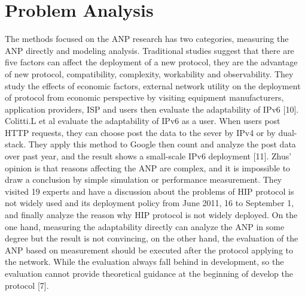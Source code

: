 \documentclass{article}
\begin{document}
\section{Problem Analysis}
The methods focused on the ANP research has two categories, measuring the ANP directly and modeling
analysis. Traditional studies suggest that there are five factors can affect the deployment of a new 
protocol, they are the advantage of new protocol, compatibility, complexity, workability and observability. 
They study the effects of economic factors, external network utility on the deployment of protocol 
from economic perspective by visiting equipment manufacturers, application providers, ISP and users 
then evaluate the adaptability of IPv6 [10]. Colitti.L et al evaluate the adaptability of IPv6 as a 
user. When users post HTTP requests, they can choose post the data to the sever by IPv4 or by dual-stack. 
They apply this method to Google then count and analyze the post data over past year, and the result 
shows a small-scale IPv6 deployment [11]. Zhus' opinion is that reasons affecting the ANP are complex, 
and it is impossible to draw a conclusion by simple simulation or performance measurement. They visited 
19 experts and have a discussion about the problems of HIP protocol is not widely used and its deployment
policy from June 2011, 16 to September 1, and finally analyze the reason why HIP protocol is not widely 
deployed. On the one hand, measuring the adaptability directly can analyze the ANP in some degree but 
the result is not convincing, on the other hand, the evaluation of the ANP based on measurement should 
be executed after the protocol applying to the network. While the evaluation always fall behind in development, 
so the evaluation cannot provide theoretical guidance at the beginning of develop the protocol [7].
\end{document}
